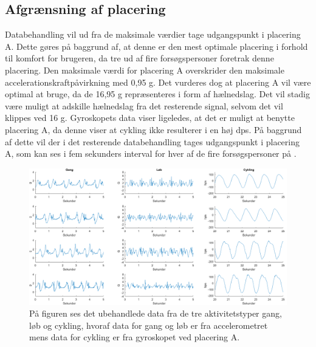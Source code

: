 \subsection{Afgrænsning af placering}
Databehandling vil ud fra de maksimale værdier tage udgangspunkt i placering A. Dette gøres på baggrund af, at denne er den mest optimale placering i forhold til komfort for brugeren, da tre ud af fire forsøgspersoner foretrak denne placering. Den maksimale værdi for placering A overskrider den maksimale accelerationskraftpåvirkning med 0,95 g. Det vurderes dog at placering A vil være optimal at bruge, da de 16,95 g repræsenteres i form af hælnedslag. Det vil stadig være muligt at adskille hælnedslag fra det resterende signal, selvom det vil klippes ved 16 g. \newline
Gyroskopets data viser ligeledes, at det er muligt at benytte placering A, da denne viser at cykling ikke resulterer i en høj dps. På baggrund af dette vil der i det resterende databehandling tages udgangspunkt i placering A, som kan ses i fem sekunders interval for hver af de fire forsøgspersoner på .
\begin{figure}[H]
	\centering
	\includegraphics[scale=0.38]{figures/qBilag/raa_data}
	\caption{På figuren ses det ubehandlede data fra de tre aktivitetstyper gang, løb og cykling, hvoraf data for gang og løb er fra accelerometret mens data for cykling er fra gyroskopet ved placering A.}
	\label{raa_data}
\end{figure}\vspace{-.25cm}

